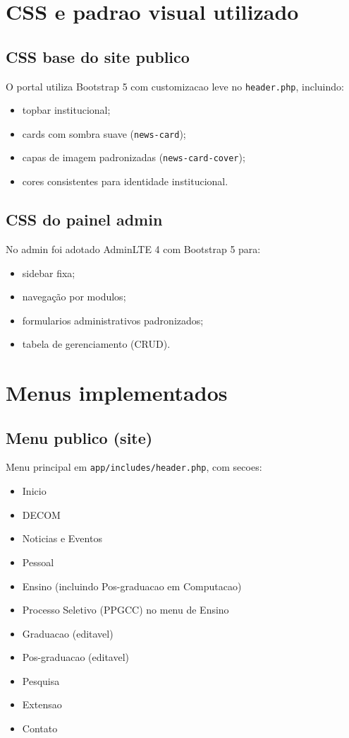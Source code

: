 \documentclass[12pt,a4paper]{article}
\begin{document}
\section{CSS e padrao visual utilizado}
\subsection{CSS base do site publico}
O portal utiliza Bootstrap 5 com customizacao leve no \texttt{header.php}, incluindo:
\begin{itemize}
    \item topbar institucional;
    \item cards com sombra suave (\texttt{news-card});
    \item capas de imagem padronizadas (\texttt{news-card-cover});
    \item cores consistentes para identidade institucional.
\end{itemize}

\subsection{CSS do painel admin}
No admin foi adotado AdminLTE 4 com Bootstrap 5 para:
\begin{itemize}
    \item sidebar fixa;
    \item navegação por modulos;
    \item formularios administrativos padronizados;
    \item tabela de gerenciamento (CRUD).
\end{itemize}

\section{Menus implementados}
\subsection{Menu publico (site)}
Menu principal em \texttt{app/includes/header.php}, com secoes:
\begin{itemize}
    \item Inicio
    \item DECOM
    \item Noticias e Eventos
    \item Pessoal
    \item Ensino (incluindo Pos-graduacao em Computacao)
    \item Processo Seletivo (PPGCC) no menu de Ensino
    \item Graduacao (editavel)
    \item Pos-graduacao (editavel)
    \item Pesquisa
    \item Extensao
    \item Contato
\end{itemize}
\end{document}
